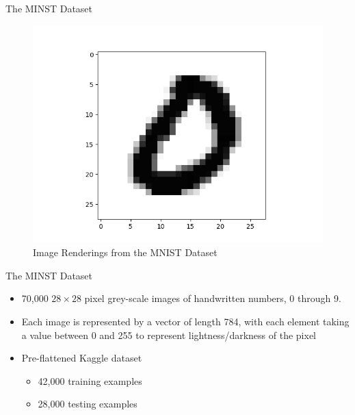 \documentclass[titlepage,leqno]{beamer}%
\begin{document}
\begin{frame}{The MINST Dataset}
\begin{figure}[h]
\begin{minipage}[t]{0.3\textwidth}
    \end{minipage}
    \begin{minipage}[t]{0.3\textwidth}
        \includegraphics[width=\textwidth]{img6render.png}
    \end{minipage}
  \caption{Image Renderings from the MNIST Dataset}
\end{figure}
\end{frame}
\begin{frame}{The MINST Dataset}
\begin{itemize}
	\item 70,000 $28\times 28$ pixel grey-scale images of handwritten numbers, 0 through 9.
	\item Each image is represented by a vector of length 784, with each element taking a value between 0 and 255 to represent lightness/darkness of the pixel
	\item Pre-flattened Kaggle dataset
	\begin{itemize}
		\item 42,000 training examples
		\item 28,000 testing examples
	\end{itemize}
\end{itemize}
\end{frame}
\end{document}
